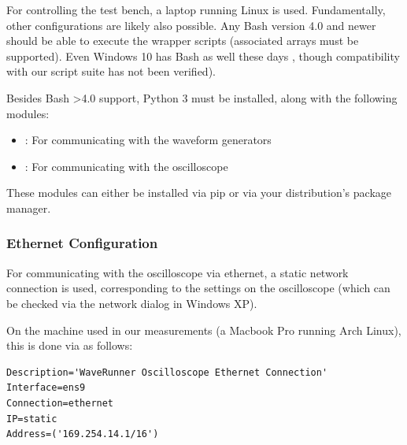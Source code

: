 For controlling the test bench, a laptop running Linux is used. Fundamentally,
other configurations are likely also  possible. Any Bash version 4.0 and newer
should  be able  to execute  the wrapper  scripts (associated  arrays must  be
supported). Even Windows 10  has Bash as well  these days \cite{ref:W10:bash},
though compatibility with our script suite has not been verified).

Besides  Bash  >4.0 support,  Python  3  must  be  installed, along  with  the
following modules:

\begin{itemize}\tightlist
    \item
        : For communicating with the waveform generators
    \item
        : For communicating with the oscilloscope
\end{itemize}

These  modules can  either be  installed via  pip or  via your  distribution's
package manager.


\subsubsection{Ethernet Configuration}
\label{subsubsec:laptop:netconf}

For  communicating  with  the  oscilloscope via  ethernet,  a  static  network
connection is used,  corresponding to the settings on  the oscilloscope (which
can be checked via the network dialog in Windows XP).

On the  machine used in our  measurements (a Macbook Pro  running Arch Linux),
this is done via  as follows\footnotemark:

\begin{verbatim}
Description='WaveRunner Oscilloscope Ethernet Connection'
Interface=ens9                                                                                                                                                                                            
Connection=ethernet                                                                                                                                                                                       
IP=static                                                                                                                                                                                                 
Address=('169.254.14.1/16')                                                                                                                                                                               
\end{verbatim}

